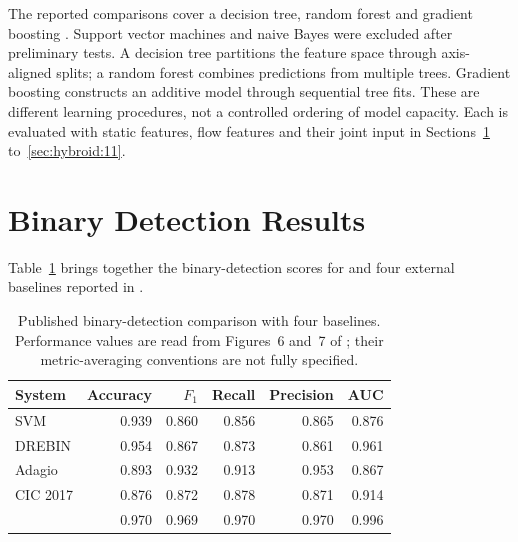 

The reported comparisons cover a decision tree, random forest and gradient boosting
\cite{norouzian2021hybroid}. Support vector machines and naive Bayes were excluded after
preliminary tests. A decision tree partitions the feature space through axis-aligned splits;
a random forest combines predictions from multiple trees. Gradient boosting constructs an
additive model through sequential tree fits. These are different learning procedures, not a
controlled ordering of model capacity. Each is evaluated with static features, flow features
and their joint input in Sections~\ref{sec:hybroid:9} to~\ref{sec:hybroid:11}.

\section{Binary Detection Results}
\label{sec:hybroid:9}

Table~\ref{tab:hybroid:baselines} brings together the binary-detection scores for \hybroid{}
and four external baselines reported in \cite{norouzian2021hybroid}.

\begin{table}
  \caption{Published binary-detection comparison with four baselines. Performance values are
  read from Figures~6 and~7 of \cite{norouzian2021hybroid}; their metric-averaging conventions
  are not fully specified.}
  \label{tab:hybroid:baselines}
  \centering
  \begin{tabular}{lrrrrr}
    \toprule
    System & Accuracy & $F_1$ & Recall & Precision & AUC \\
    \midrule
    SVM \cite{dai2015svm}                & 0.939 & 0.860 & 0.856 & 0.865 & 0.876 \\
    DREBIN \cite{arp2014drebin}          & 0.954 & 0.867 & 0.873 & 0.861 & 0.961 \\
    Adagio \cite{gascon2013structural}   & 0.893 & 0.932 & 0.913 & 0.953 & 0.867 \\
    CIC 2017 \cite{lashkari2018toward}   & 0.876 & 0.872 & 0.878 & 0.871 & 0.914 \\
    \midrule
    \hybroid{}                           & 0.970 & 0.969 & 0.970 & 0.970 & 0.996 \\
    \bottomrule
  \end{tabular}
\end{table}

